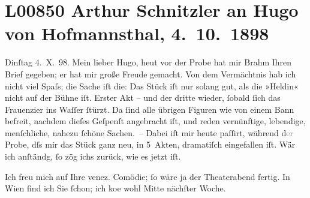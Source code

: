 

\section[Arthur Schnitzler an Hugo von Hofmannsthal, 4. 10. 1898]{L00850 Arthur Schnitzler an Hugo von Hofmannsthal, 4. 10. 1898}
\nopagebreak{}
\rehead{ }\normalsize\beginnumbering{}
\toendnotes[C]{\smallbreak\pagebreak[2]}
\toendnotes[C]{\smallbreak}
\pstart
           {\pb}Dinſtag 4. X. 98.\pend
           \vspace{0.5em}
\pstart
           Mein lieber Hugo, heut vor der Probe hat mir Brahm Ihren Brief gegeben; er hat mir große Freude gemacht. Von
               dem Vermächtnis hab ich nicht viel Spaſs; die
               Sache iſt die: Das Stück iſt nur solang gut, als die »Heldin« nicht auf der Bühne
               iſt. Erster Akt – und der dritte wieder, ſobald ſich das Frauenzi{\geminationm}er ins {\pb}Waſſer ſtürzt. Da
               ſind alle übrigen Figuren wie von einem Bann befreit, nachdem dieſes Geſpenſt
               angebracht iſt, und reden vernünftige, lebendige, menſchliche, nahezu ſchöne
               Sachen. – Dabei iſt mir heute paſſirt, während d\textcolor{gray}{er} Probe, dſs mir
               das Stück ganz neu, in 5 {\pb}Akten, dramatiſch eingefallen iſt. Wär ich anſtändg, ſo
               zög ichs zurück, wie es jetzt iſt.\pend
           
\pstart
           Ich freu mich auf Ihre venez.
                  Comödie; ſo wäre ja der Theaterabend fertig. In Wien find ich Sie ſchon; ich ko{\geminationm}e wohl Mitte
               nächſter Woche.\pend
           

